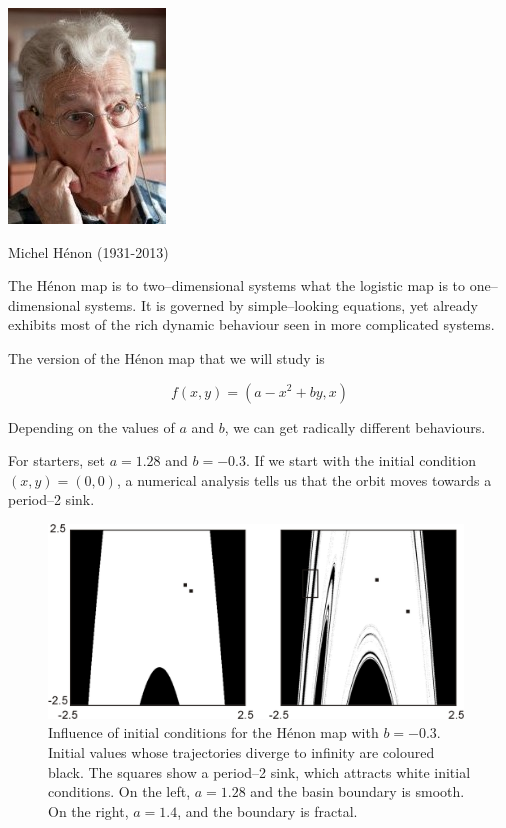\begin{marginfigure}
\includegraphics{dynamic/figures/m_henon}
\caption{Michel H\'{e}non (1931-2013)}
\end{marginfigure}

The H\'{e}non map is to two--dimensional systems what the logistic map is to one--dimensional systems. It is governed by simple--looking equations, yet already exhibits most of the rich dynamic behaviour seen in more complicated systems.

The version of the H\'{e}non map that we will study is

\begin{equation}
f(x,y) = (a-x^2+by, x)
\end{equation} 

Depending on the values of $a$ and $b$, we can get radically different behaviours.

For starters, set $a=1.28$ and $b=-0.3$. If we start with the initial condition $(x,y)=(0,0)$, a numerical analysis tells us that the orbit moves towards a period--2 sink.

\begin{figure}[H]
\centering
\includegraphics[width=11cm]{dynamic/figures/henon_basin}
\caption{Influence of initial conditions for the H\'{e}non map with $b=-0.3$. Initial values whose trajectories diverge to infinity are coloured black. The squares show a period--2 sink, which attracts white initial conditions. On the left, $a=1.28$ and the basin boundary is smooth. On the right, $a=1.4$, and the boundary is fractal.}
\label{fig-henon-basin}
\end{figure} 

